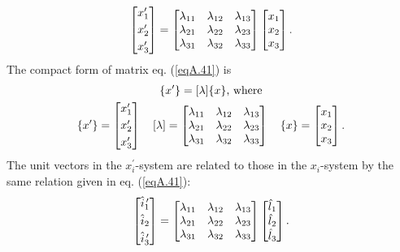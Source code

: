 \documentclass{AeroStructure-ERJohnson}
\begin{document}
\begin{align}\label{eqA.41}
\left[\begin{array}{@{}l@{}}
x_{1}^{\prime} \\[3pt]
x_{2}^{\prime} \\[3pt]
x_{3}^{\prime}\end{array}\right]=\left[\begin{array}{@{}lll@{}}\lambda_{11} & \lambda_{12} & \lambda_{13} \\\lambda_{21} & \lambda_{22} & \lambda_{23} \\\lambda_{31} & \lambda_{32} & \lambda_{33}\end{array}\right]\left[\begin{array}{@{}l@{}}x_{1} \\x_{2} \\x_{3}\end{array}\right].
\end{align}
The compact form of matrix eq. (\ref{eqA.41}) is
\begin{gather}
\left\{x^{\prime}\right\}=[\lambda]\{x\}\mbox{, where}\label{eqA.42}\\
\left\{x^{\prime}\right\}=\left[\begin{array}{@{}l@{}}x_{1}^{\prime} \\[3pt]
x_{2}^{\prime} \\[3pt]
x_{3}^{\prime}\end{array}\right] \quad[\lambda]=\left[\begin{array}{@{}lll@{}}\lambda_{11} & \lambda_{12} & \lambda_{13} \\\lambda_{21} & \lambda_{22} & \lambda_{23} \\\lambda_{31} & \lambda_{32} & \lambda_{33}\end{array}\right] \quad\{x\}=\left[\begin{array}{@{}l@{}}x_{1} \\x_{2} \\x_{3}\end{array}\right].\label{eqA.43}
\end{gather}
The unit vectors in the $x_{i}^{\prime}$-system are related to those in the $x_{i}$-system by the same relation given in eq. (\ref{eqA.41}):
\begin{align}\label{eqA.44}
\left[\begin{array}{@{}l@{}}
\hat{i}_{1}^{\,\prime} \\[3pt]
\hat{i}_{2} \\[3pt]
\hat{i}_{3}^{\,\prime}\end{array}\right]=\left[\begin{array}{@{}lll@{}}\lambda_{11} & \lambda_{12} & \lambda_{13} \\\lambda_{21} & \lambda_{22} & \lambda_{23} \\\lambda_{31} & \lambda_{32} & \lambda_{33}\end{array}\right]\left[\begin{array}{@{}l@{}}\hat{l}_{1} \\\hat{l}_{2} \\\hat{l}_{3}\end{array}\right].
\end{align}
\end{document}
